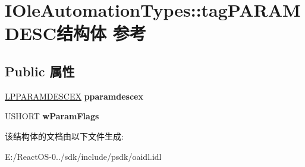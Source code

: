 \hypertarget{struct_i_ole_automation_types_1_1tag_p_a_r_a_m_d_e_s_c}{}\section{I\+Ole\+Automation\+Types\+:\+:tag\+P\+A\+R\+A\+M\+D\+E\+S\+C结构体 参考}
\label{struct_i_ole_automation_types_1_1tag_p_a_r_a_m_d_e_s_c}
\subsection*{Public 属性}
\begin{DoxyCompactItemize}
\item 
\mbox{\label{struct_i_ole_automation_types_1_1tag_p_a_r_a_m_d_e_s_c_a73b073bb7ba359a8aa42f40880f64a5b}} 
\hyperlink{struct_i_ole_automation_types_1_1tag_p_a_r_a_m_d_e_s_c_e_x}{L\+P\+P\+A\+R\+A\+M\+D\+E\+S\+C\+EX} {\bfseries pparamdescex}
\item 
\mbox{\label{struct_i_ole_automation_types_1_1tag_p_a_r_a_m_d_e_s_c_a91ee72377577c9ce3a70a5abfe7a852b}} 
U\+S\+H\+O\+RT {\bfseries w\+Param\+Flags}
\end{DoxyCompactItemize}


该结构体的文档由以下文件生成\+:\begin{DoxyCompactItemize}
\item 
E\+:/\+React\+O\+S-\/0../sdk/include/psdk/oaidl.\+idl\end{DoxyCompactItemize}
